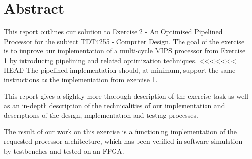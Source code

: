\chapter*{Abstract}

This report outlines our solution to Exercise 2 - An Optimized Pipelined Processor for the subject TDT4255 - Computer Design.
The goal of the exercise is to improve our implementation of a multi-cycle MIPS processor from Exercise 1 by introducing pipelining and related optimization techniques.
<<<<<<< HEAD
The pipelined implementation should, at minimum, support the same instructions as the implementation from exercise 1.

This report gives a slightly more thorough description of the exercise task as well as an in-depth description of the technicalities of our implementation and descriptions of the design, implementation and testing processes.

The result of our work on this exercise is a functioning implementation of the requested processor architecture, which has been verified in software simulation by testbenches and tested on an FPGA.
